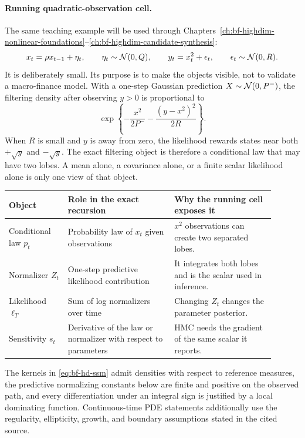 \paragraph{Running quadratic-observation cell.}
The same teaching example will be used through
Chapters~\ref{ch:bf-highdim-nonlinear-foundations}--\ref{ch:bf-highdim-candidate-synthesis}:
\begin{equation}
  x_t=\rho x_{t-1}+\eta_t,\qquad
  \eta_t\sim\mathcal{N}(0,Q),\qquad
  y_t=x_t^2+\epsilon_t,\qquad
  \epsilon_t\sim\mathcal{N}(0,R).
  \label{eq:bf-hd-running-cell}
\end{equation}
It is deliberately small.  Its purpose is to make the objects visible, not to
validate a macro-finance model.  With a one-step Gaussian prediction
\(X\sim\mathcal{N}(0,P^-)\), the filtering density after observing \(y>0\) is
proportional to
\begin{equation}
  \exp\!\left\{-\frac{x^2}{2P^-}
  -\frac{(y-x^2)^2}{2R}\right\}.
  \label{eq:bf-hd-running-posterior}
\end{equation}
When \(R\) is small and \(y\) is away from zero, the likelihood rewards states
near both \(+\sqrt y\) and \(-\sqrt y\).  The exact filtering object is
therefore a conditional law that may have two lobes.  A mean alone, a covariance
alone, or a finite scalar likelihood alone is only one view of that object.

\small
\begin{longtable}{@{}p{0.20\linewidth}p{0.36\linewidth}p{0.34\linewidth}@{}}
\toprule
Object & Role in the exact recursion & Why the running cell exposes it \\
\midrule
\endhead
Conditional law \(p_t\) & Probability law of \(x_t\) given observations &
\(x^2\) observations can create two separated lobes. \\
Normalizer \(Z_t\) & One-step predictive likelihood contribution &
It integrates both lobes and is the scalar used in inference. \\
Likelihood \(\ell_T\) & Sum of log normalizers over time & Changing \(Z_t\)
changes the parameter posterior. \\
Sensitivity \(s_t\) & Derivative of the law or normalizer with respect to
parameters & HMC needs the gradient of the same scalar it reports. \\
\bottomrule
\end{longtable}
\normalsize

\begin{assumption}
\label{ass:bf-hd-dominated}
The kernels in \eqref{eq:bf-hd-ssm} admit densities with respect to reference
measures, the predictive normalizing constants below are finite and positive on
the observed path, and every differentiation under an integral sign is justified
by a local dominating function.  Continuous-time PDE statements additionally
use the regularity, ellipticity, growth, and boundary assumptions stated in the
cited source.
\end{assumption}

